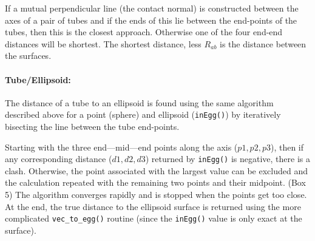 \documentclass[review]{elsarticle}
\begin{document}
{{{{{If a mutual perpendicular line (the contact normal) is constructed between the axes of a pair
of tubes and if the ends of this lie between the end-points of the tubes, then this is the
closest approach.   Otherwise one of the four end-end distances will be shortest.   The shortest
distance, less $R_{ab}$ is the distance between the surfaces.

\paragraph{Tube/Ellipsoid:\\}

The distance of a tube to an ellipsoid is found using the same algorithm described above
for a point (sphere) and ellipsoid ({\tt inEgg()}) by iteratively bisecting the line between the
tube end-points.

Starting with the three end---mid---end points along the axis ($p1,p2,p3$), then if any corresponding
distance ($d1,d2,d3$) returned by {\tt inEgg()} is negative, there is a clash.   Otherwise, the point
associated with the largest value can be excluded and the calculation repeated with the remaining
two points and their midpoint. (Box 5)   The algorithm converges rapidly and is stopped when the points
get too close.   At the end, the true distance to the ellipsoid surface is returned using the more
complicated {\tt vec\_to\_egg()} routine (since the {\tt inEgg()} value is only exact at the surface).

}}}}}
\end{document}
